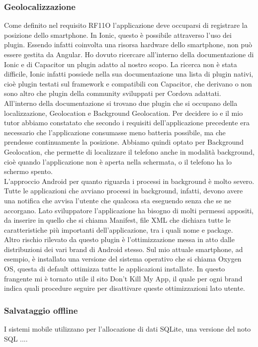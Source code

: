 \subsubsection{Geolocalizzazione}
Come definito nel requisito RF11O l'applicazione deve occuparsi di registrare la posizione dello smartphone. In Ionic, questo è possibile
attraverso l'uso dei plugin. Essendo infatti coinvolta una risorsa hardware dello smartphone, non può essere gestita da Angular. Ho dovuto
ricercare all'interno della documentazione di Ionic e di Capacitor un plugin adatto al nostro scopo. La ricerca non è stata difficile, Ionic
infatti possiede nella sua documentazione una lista di plugin nativi, cioè plugin testati sul framework e compatibili con Capacitor, che
derivano o non sono altro che plugin della community sviluppati per Cordova adattati. \\
\noindent All'interno della documentazione si trovano due plugin che si occupano della localizzazione, Geolocation e Background Geolocation.
Per decidere io e il mio tutor abbiamo constatato che secondo i requisiti dell'applicazione precedente era necessario che l'applicazione
consumasse meno batteria possibile, ma che prendesse continuamente la posizione. Abbiamo quindi optato per Background Geolocation, che
permette di localizzare il telefono anche in modalità background, cioè quando l'applicazione non è aperta nella schermata, o il telefono ha
lo schermo spento. \\
\noindent L'approccio Android per quanto riguarda i processi in background è molto severo. Tutte le applicazioni che avviano processi in
background, infatti, devono avere una notifica che avvisa l'utente che qualcosa sta eseguendo senza che se ne accorgano. Lato sviluppatore
l'applicazione ha bisogno di molti permessi appositi, da inserire in quello che si chiama Manifest, file XML che dichiara tutte le
caratteristiche più importanti dell'applicazione, tra i quali nome e package. \\
Altro rischio rilevato da questo plugin è l'ottimizzazione messa in atto dalle distribuzioni dei vari brand di Android stesso. Sul mio
attuale smartphone, ad esempio, è installato una versione del sistema operativo che si chiama Oxygen OS, questa di default ottimizza tutte
le applicazioni installate. In questo frangente mi è tornato utile il sito Don't Kill My App, il quale per ogni brand indica quali procedure
seguire per disattivare queste ottimizzazioni lato utente.

\subsubsection{Salvataggio offline}
I sistemi mobile utilizzano per l'allocazione di dati SQLite, una versione del noto SQL .... 